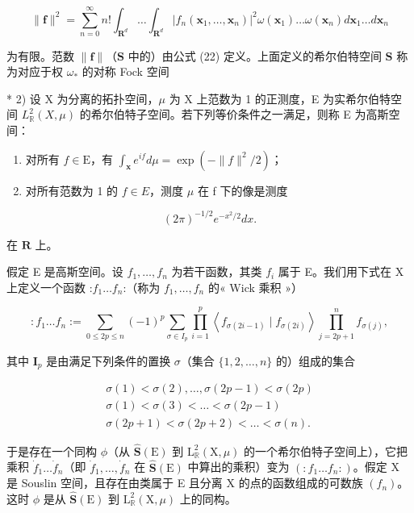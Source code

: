 \[
\| \mathbf {f} \| ^ {2} = \sum_ {n = 0} ^ {\infty} n! \int_ {\mathbf {R} ^ {d}} \dots \int_ {\mathbf {R} ^ {d}} \left| f _ {n} (\mathbf {x} _ {1}, \dots , \mathbf {x} _ {n}) \right| ^ {2} \omega (\mathbf {x} _ {1}) \dots \omega (\mathbf {x} _ {n}) d \mathbf {x} _ {1} \dots d \mathbf {x} _ {n}\tag{22}
\]

为有限。范数 \(\| \mathbf{f}\|\)（\(\mathbf{S}\) 中的）由公式 (22) 定义。上面定义的希尔伯特空间 \(\mathbf{S}\) 称为对应于权 \(\omega_{*}\) 的对称 Fock 空间

* 2) 设 X 为分离的拓扑空间，\(\mu\) 为 X 上范数为 1 的正测度，E 为实希尔伯特空间 \(L_{\mathbb{R}}^{2}(X,\mu)\) 的希尔伯特子空间。若下列等价条件之一满足，则称 E 为高斯空间：

\begin{enumerate}
\def\labelenumi{\alph{enumi})}
\item
  对所有 \(f \in \mathrm{E}\)，有 \(\int_{\mathbf{x}} e^{if} d\mu = \exp(-\|f\|^2/2)\)；
\item
  对所有范数为 1 的 \(f \in E\)，测度 \(\mu\) 在 f 下的像是测度
\end{enumerate}

\[
(2 \pi) ^ {- 1 / 2} e ^ {- x ^ {2} / 2} d x.
\]

在 \(\mathbf{R}\) 上。

假定 E 是高斯空间。设 \(f_1, \ldots, f_n\) 为若干函数，其类 \(f_i\) 属于 E。我们用下式在 X 上定义一个函数 :\(f_1 \ldots f_n\):（称为 \(f_1, \ldots, f_n\) 的« Wick 乘积 »）

\[
: f _ {1} \dots f _ {n} := \sum_ {0 \leqslant 2 p \leqslant n} (- 1) ^ {p} \sum_ {\sigma \in I _ {p}} \prod_ {i = 1} ^ {p} \left\langle f _ {\sigma (2 i - 1)} \mid f _ {\sigma (2 i)} \right\rangle \prod_ {j = 2 p + 1} ^ {n} f _ {\sigma (j)},\tag{23}
\]

其中 \(\mathbf{I}_p\) 是由满足下列条件的置换 \(\sigma\)（集合 \(\{1,2,\dots,n\}\) 的）组成的集合

\[
\begin{array}{l} \sigma (1) <   \sigma (2), \dots , \sigma (2 p - 1) <   \sigma (2 p) \\ \sigma (1) <   \sigma (3) <   \dots <   \sigma (2 p - 1) \\ \sigma (2 p + 1) <   \sigma (2 p + 2) <   \dots <   \sigma (n). \end{array}
\]

于是存在一个同构 \(\phi\)（从 \(\hat{\mathbf{S}}(\mathrm{E})\) 到 \(\mathrm{L}_{\mathbb{R}}^{2}(\mathrm{X},\mu)\) 的一个希尔伯特子空间上），它把乘积 \(\dot{f}_1\dots \dot{f}_n\)（即 \(\dot{f}_1,\dots ,\dot{f}_n\) 在 \(\hat{\mathbf{S}}(\mathrm{E})\) 中算出的乘积）变为 \((:f_1\dots f_n:)\)。假定 X 是 Souslin 空间，且存在由类属于 E 且分离 X 的点的函数组成的可数族 \((f_{n})\)。这时 \(\phi\) 是从 \(\hat{\mathbf{S}}(\mathrm{E})\) 到 \(\mathrm{L}_{\mathbb{R}}^{2}(\mathrm{X},\mu)\) 上的同构。

